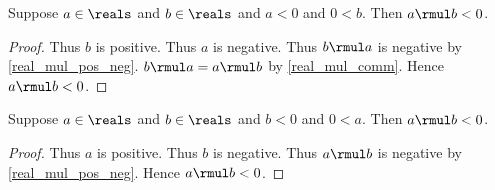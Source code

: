 \begin{theorem}\label{real_mul_neg_opposite_sign_left}
    Suppose $a\in\reals$ and $b\in\reals$ and $a < 0$ and $0 < b$.
    Then $a \rmul b < 0$.
\end{theorem}
\begin{proof}
    Thus $b$ is positive.
    Thus $a$ is negative.
    Thus $b \rmul a$ is negative by \cref{real_mul_pos_neg}.
    $b \rmul a = a \rmul b$ by \cref{real_mul_comm}.
    Hence $a \rmul b < 0$.
\end{proof}

\begin{theorem}\label{real_mul_neg_opposite_sign_right}
    Suppose $a\in\reals$ and $b\in\reals$ and $b < 0$ and $0 < a$.
    Then $a \rmul b < 0$.
\end{theorem}
\begin{proof}
    Thus $a$ is positive.
    Thus $b$ is negative.
    Thus $a \rmul b$ is negative by \cref{real_mul_pos_neg}.
    Hence $a \rmul b < 0$.
\end{proof}

